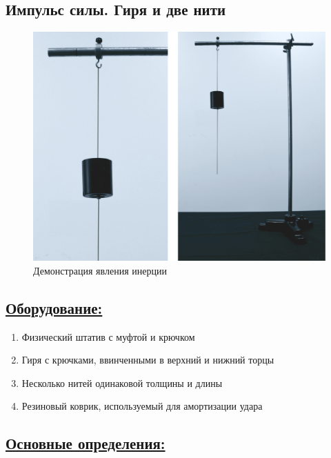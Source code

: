 \documentclass[14pt,a4paper,oneside]{extarticle}	%
\begin{document}

\begin{center}
	\subsection*{Импульс силы. Гиря и две нити}
\end{center}

\begin{figure}[H] 	%
	\centering 		%
	\includegraphics[width=0.9\linewidth]{inertia-2.png}
	\caption{Демонстрация явления инерции}
\end{figure}

\subsection*{\underline{Оборудование:}}

\begin{enumerate}
	\item Физический штатив с муфтой и крючком
	\item Гиря с крючками, ввинченными в верхний и нижний торцы
	\item Несколько нитей одинаковой толщины и длины
	\item Резиновый коврик, используемый для амортизации удара
\end{enumerate}

\newpage
\subsection*{\underline{Основные определения:}}
\end{document}
